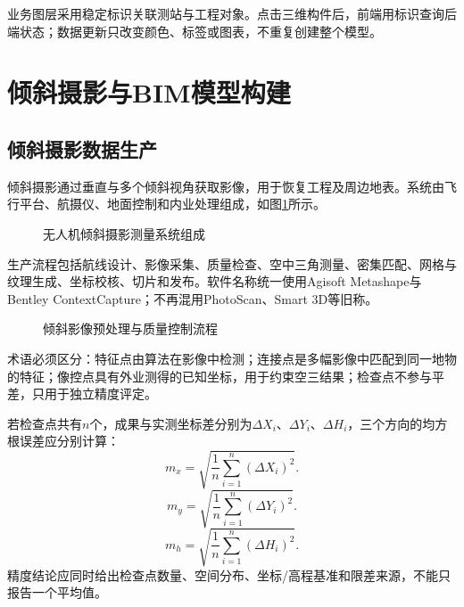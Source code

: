 业务图层采用稳定标识关联测站与工程对象。点击三维构件后，前端用标识查询后端状态；数据更新只改变颜色、标签或图表，不重复创建整个模型。

\section{倾斜摄影与BIM模型构建}

\subsection{倾斜摄影数据生产}

倾斜摄影通过垂直与多个倾斜视角获取影像，用于恢复工程及周边地表。系统由飞行平台、航摄仪、地面控制和内业处理组成，如图\ref{fig:uav-oblique-system}所示。

\begin{figure}[htbp]
\centering
\uavObliquePhotographySystem
\caption{无人机倾斜摄影测量系统组成}
\label{fig:uav-oblique-system}
\end{figure}

生产流程包括航线设计、影像采集、质量检查、空中三角测量、密集匹配、网格与纹理生成、坐标校核、切片和发布。软件名称统一使用Agisoft Metashape与Bentley ContextCapture；不再混用PhotoScan、Smart 3D等旧称。

\begin{figure}[htbp]
\centering
\obliqueImagePreprocessQC
\caption{倾斜影像预处理与质量控制流程}
\label{fig:oblique-preprocess}
\end{figure}

术语必须区分：特征点由算法在影像中检测；连接点是多幅影像中匹配到同一地物的特征；像控点具有外业测得的已知坐标，用于约束空三结果；检查点不参与平差，只用于独立精度评定。

若检查点共有$n$个，成果与实测坐标差分别为$\Delta X_i$、$\Delta Y_i$、$\Delta H_i$，三个方向的均方根误差应分别计算：
\begin{equation}
  m_x=\sqrt{\frac{1}{n}\sum_{i=1}^{n}(\Delta X_i)^2}.
  \label{eq:rmse-x}
\end{equation}
\begin{equation}
  m_y=\sqrt{\frac{1}{n}\sum_{i=1}^{n}(\Delta Y_i)^2}.
  \label{eq:rmse-y}
\end{equation}
\begin{equation}
  m_h=\sqrt{\frac{1}{n}\sum_{i=1}^{n}(\Delta H_i)^2}.
  \label{eq:rmse-h}
\end{equation}
精度结论应同时给出检查点数量、空间分布、坐标/高程基准和限差来源，不能只报告一个平均值。

